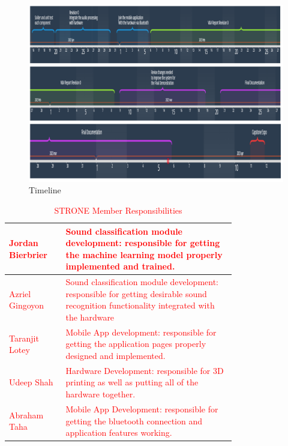 \documentclass[12pt, titlepage]{article}
\begin{document}
\begin{figure}[H]
  \includegraphics[clip,width=\textwidth,height=\textheight,keepaspectratio]{Timeline2.pdf}
  \caption{Timeline}
  \label{Timeline} 
\end{figure}

\begin{center}
\begin{table}[H]
  \caption{\textcolor{red}{STRONE Member Responsibilities}}
  \centering
  \begin{tabular}{|l|p{0.75\linewidth}|}
  \hline
  \textcolor{red}{Jordan Bierbrier} & \textcolor{red}{Sound classification module development: responsible for getting the machine learning model properly implemented and trained.}  \\
  \hline
  \textcolor{red}{Azriel Gingoyon} & \textcolor{red}{Sound classification module development: responsible for getting desirable sound recognition functionality integrated with the hardware}  \\
  \hline
  \textcolor{red}{Taranjit Lotey} & \textcolor{red}{Mobile App development: responsible for getting the application pages properly designed and implemented.}  \\
  \hline
  \textcolor{red}{Udeep Shah} & \textcolor{red}{Hardware Development: responsible for 3D printing as well as putting all of the hardware together.}  \\
  \hline
  \textcolor{red}{Abraham Taha} & \textcolor{red}{Mobile App Development: responsible for getting the bluetooth connection and application features working.}  \\
  \hline
  \end{tabular}
\end{table}
\end{center}
\end{document}

